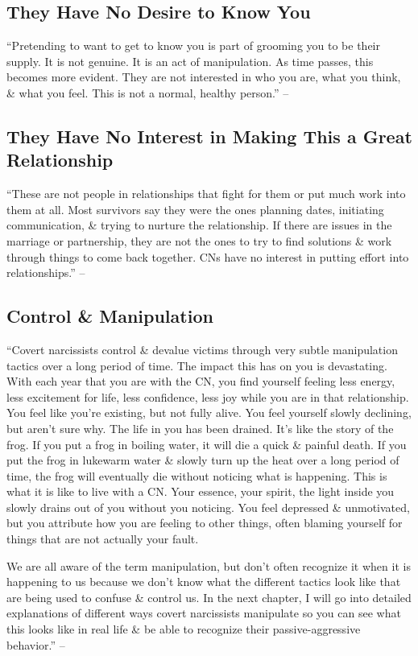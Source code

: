 \documentclass{article}
\numberwithin{equation}{section}
\begin{document}
\subsection{They Have No Desire to Know You}
``Pretending to want to get to know you is part of grooming you to be their supply. It is not genuine. It is an act of manipulation. As time passes, this becomes more evident. They are not interested in who you are, what you think, \& what you feel. This is not a normal, healthy person.'' -- \cite[p. 71]{Mirza2017}

\subsection{They Have No Interest in Making This a Great Relationship}
``These are not people in relationships that fight for them or put much work into them at all. Most survivors say they were the ones planning dates, initiating communication, \& trying to nurture the relationship. If there are issues in the marriage or partnership, they are not the ones to try to find solutions \& work through things to come back together. CNs have no interest in putting effort into relationships.'' -- \cite[pp. 71--72]{Mirza2017}

\subsection{Control \& Manipulation}
``Covert narcissists control \& devalue victims through very subtle manipulation tactics over a long period of time. The impact this has on you is devastating. With each year that you are with the CN, you find yourself feeling less energy, less excitement for life, less confidence, less joy while you are in that relationship. You feel like you're existing, but not fully alive. You feel yourself slowly declining, but aren't sure why. The life in you has been drained. It's like the story of the frog. If you put a frog in boiling water, it will die a quick \& painful death. If you put the frog in lukewarm water \& slowly turn up the heat over a long period of time, the frog will eventually die without noticing what is happening. This is what it is like to live with a CN. Your essence, your spirit, the light inside you slowly drains out of you without you noticing. You feel depressed \& unmotivated, but you attribute how you are feeling to other things, often blaming yourself for things that are not actually your fault.

We are all aware of the term manipulation, but don't often recognize it when it is happening to us because we don't know what the different tactics look like that are being used to confuse \& control us. In the next chapter, I will go into detailed explanations of different ways covert narcissists manipulate so you can see what this looks like in real life \& be able to recognize their passive-aggressive behavior.'' -- \cite[p.72]{Mirza2017}
\end{document}
